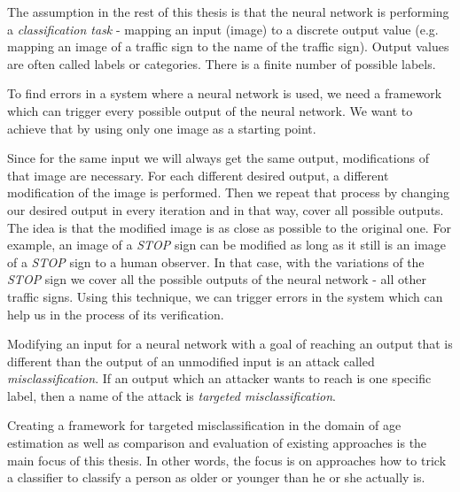 The assumption in the rest of this thesis is that the neural network is performing a \textit{classification task} - mapping an input (image) to a discrete output value (e.g. mapping an image of a traffic sign to the name of the traffic sign).  Output values are often called labels or categories. There is a finite number of possible labels.

To find errors in a system where a neural network is used, we need a framework which can trigger every possible output of the neural network.  We want to achieve that by using only one image as a starting point. 

Since for the same input we will always get the same output, modifications of that image are necessary. For each different desired output, a different modification of the image is performed.
Then we repeat that process by changing our desired output in every iteration and in that way, cover all possible outputs. The idea is that the modified image is as close as possible to the original one. For example, an image of a  \textit{STOP} sign can be modified as long as it still is an image of a  \textit{STOP} sign to a human observer. In that case, with the variations of the \textit{STOP} sign we cover all the possible outputs of the neural network - all other traffic signs. Using this technique, we can trigger errors in the system which can help us in the process of its verification. 

Modifying an input for a neural network with a goal of reaching an output that is different than the output of an unmodified input is an attack called \textit{misclassification}. If an output which an attacker wants to reach is one specific label, then a name of the attack is \textit{targeted misclassification}.

Creating a framework for targeted misclassification in the domain of age estimation as well as comparison and evaluation of existing approaches is the main focus of this thesis. In other words, the focus is on approaches how to trick a classifier to classify a person as older or younger than he or she actually is. 